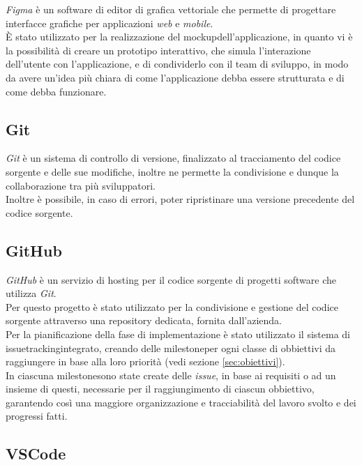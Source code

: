 \emph{Figma}\cite{site:figma} è un software di editor di grafica vettoriale che permette di progettare interfacce grafiche per applicazioni \emph{web} e \emph{mobile}.\\
È stato utilizzato per la realizzazione del \gls{mockup}\glsoccur dell'applicazione, in quanto vi è la possibilità di creare un prototipo interattivo, che simula l'interazione dell'utente con l'applicazione, e di condividerlo con il team di sviluppo, in modo da avere un'idea più chiara di come l'applicazione debba essere strutturata e di come debba funzionare.

\subsection*{Git}
\label{subsec:git}

\emph{Git}\cite{site:git} è un sistema di controllo di versione, finalizzato al tracciamento del codice sorgente e delle sue modifiche, inoltre ne permette la condivisione e dunque la collaborazione tra più sviluppatori.\\
Inoltre è possibile, in caso di errori, poter ripristinare una versione precedente del codice sorgente.

\subsection*{GitHub}
\label{subsec:github}

\emph{GitHub}\cite{site:github} è un servizio di hosting per il codice sorgente di progetti software che utilizza \emph{Git}.\\
Per questo progetto è stato utilizzato per la condivisione e gestione del codice sorgente attraverso una repository dedicata, fornita dall'azienda.\\
Per la pianificazione della fase di implementazione è stato utilizzato il sistema di \gls{issuetracking}\glsoccur integrato, creando delle \gls{milestone}\glsoccur per ogni classe di obbiettivi da raggiungere in base alla loro priorità (vedi sezione \ref{sec:obiettivi}).\\
In ciascuna \gls{milestone}\glsoccur sono state create delle \emph{issue}, in base ai requisiti o ad un insieme di questi, necessarie per il raggiungimento di ciascun obbiettivo, garantendo così una maggiore organizzazione e tracciabilità del lavoro svolto e dei progressi fatti.

\subsection*{VSCode}
\label{subsec:vscode}

